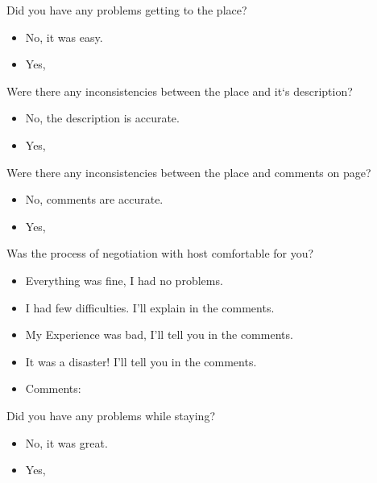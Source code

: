 Did you have any problems getting to the place? 
\begin{itemize}
	\item No, it was easy.
    \item Yes, \underline{\hspace{8cm}}
\end{itemize}
\vspace{0.2cm}

Were there any inconsistencies between the place and it`s description?
\begin{itemize}
	\item No, the description is accurate.
    \item Yes, \underline{\hspace{8cm}}
\end{itemize}
\vspace{0.2cm}

Were there any inconsistencies between the place and comments on page?
\begin{itemize}
	\item No, comments are accurate.
    \item Yes, \underline{\hspace{8cm}}
\end{itemize}
\vspace{0.2cm}

Was the process of negotiation with host comfortable for you? 
\begin{itemize}
 \item Everything was fine, I had no problems.
 \item I had few difficulties. I'll explain in the comments.
 \item My Experience was bad, I'll tell you in the comments.
 \item It was a disaster! I'll tell you in the comments.
 \item Comments: \underline{\hspace{8cm}}   
\end{itemize}
\vspace{0.2cm}

Did you have any problems while staying?
\begin{itemize}
	\item No, it was great.
    \item Yes, \underline{\hspace{8cm}}
\end{itemize}

